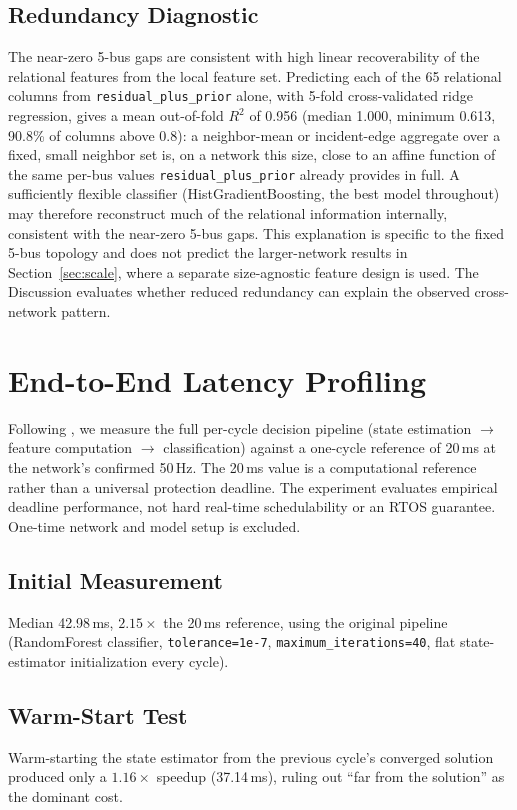 \documentclass[conference]{IEEEtran}
\begin{document}
\subsection{Redundancy Diagnostic}
The near-zero 5-bus gaps are consistent with high linear recoverability of the relational features from the local feature set. Predicting each of the 65 relational columns from \texttt{residual\_plus\_prior} alone, with 5-fold cross-validated ridge regression, gives a mean out-of-fold $R^2$ of 0.956 (median 1.000, minimum 0.613, 90.8\% of columns above 0.8): a neighbor-mean or incident-edge aggregate over a fixed, small neighbor set is, on a network this size, close to an affine function of the same per-bus values \texttt{residual\_plus\_prior} already provides in full. A sufficiently flexible classifier (HistGradientBoosting, the best model throughout) may therefore reconstruct much of the relational information internally, consistent with the near-zero 5-bus gaps. This explanation is specific to the fixed 5-bus topology and does not predict the larger-network results in Section~\ref{sec:scale}, where a separate size-agnostic feature design is used. The Discussion evaluates whether reduced redundancy can explain the observed cross-network pattern.

\section{End-to-End Latency Profiling}
\label{sec:latency}

Following \cite{abukhousa2026latency}, we measure the full per-cycle decision pipeline (state estimation $\rightarrow$ feature computation $\rightarrow$ classification) against a one-cycle reference of 20\,ms at the network's confirmed 50\,Hz. The 20\,ms value is a computational reference rather than a universal protection deadline. The experiment evaluates empirical deadline performance, not hard real-time schedulability or an RTOS guarantee. One-time network and model setup is excluded.

\subsection{Initial Measurement}
Median 42.98\,ms, $2.15\times$ the 20\,ms reference, using the original pipeline (RandomForest classifier, \texttt{tolerance=1e-7}, \texttt{maximum\_iterations=40}, flat state-estimator initialization every cycle).

\subsection{Warm-Start Test}
Warm-starting the state estimator from the previous cycle's converged solution produced only a $1.16\times$ speedup (37.14\,ms), ruling out ``far from the solution'' as the dominant cost.
\end{document}
